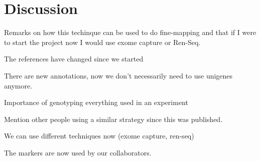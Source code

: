 
\section{Discussion} 
Remarks on how this techinque can be used to do fine-mapping and that if I were to start the project now I would  use exome capture or Ren-Seq. 

The references have changed since we started

There are new annotations, now we don't necessarily need to use unigenes anymore. 

Importance of genotyping everything used in an experiment

Mention other people using a similar strategy since this was published. 

We can use different techniques now (exome capture, ren-seq)

The markers are now used by our collaborators. 